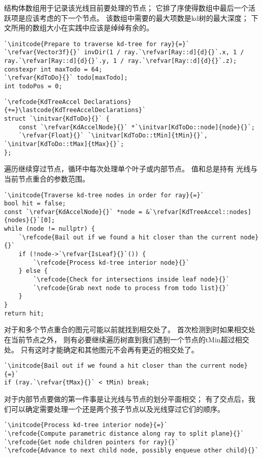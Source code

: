 结构体数组用于记录该光线目前要处理的节点；
它排了序使得数组中最后一个活跃项是应该考虑的下一个节点。
该数组中需要的最大项数是kd树的最大深度；
下文所用的数组大小在实践中应该是绰绰有余的。
\begin{lstlisting}
`\initcode{Prepare to traverse kd-tree for ray}{=}`
`\refvar{Vector3f}{}` invDir(1 / ray.`\refvar[Ray::d]{d}{}`.x, 1 / ray.`\refvar[Ray::d]{d}{}`.y, 1 / ray.`\refvar[Ray::d]{d}{}`.z);
constexpr int maxTodo = 64;
`\refvar{KdToDo}{}` todo[maxTodo];
int todoPos = 0;
\end{lstlisting}
\begin{lstlisting}
`\refcode{KdTreeAccel Declarations}{+=}\lastcode{KdTreeAccelDeclarations}`
struct `\initvar{KdToDo}{}` {
    const `\refvar{KdAccelNode}{}` *`\initvar[KdToDo::node]{node}{}`;
    `\refvar{Float}{}` `\initvar[KdToDo::tMin]{tMin}{}`, `\initvar[KdToDo::tMax]{tMax}{}`;
};
\end{lstlisting}

遍历继续穿过节点，循环中每次处理单个叶子或内部节点。
值和总是持有
光线与当前节点重合的参数范围。
\begin{lstlisting}
`\initcode{Traverse kd-tree nodes in order for ray}{=}`
bool hit = false;
const `\refvar{KdAccelNode}{}` *node = &`\refvar[KdTreeAccel::nodes]{nodes}{}`[0];
while (node != nullptr) {
    `\refcode{Bail out if we found a hit closer than the current node}{}`
    if (!node->`\refvar{IsLeaf}{}`()) {
        `\refcode{Process kd-tree interior node}{}`
    } else {
        `\refcode{Check for intersections inside leaf node}{}`
        `\refcode{Grab next node to process from todo list}{}`
    }
}
return hit;
\end{lstlisting}

对于和多个节点重合的图元可能以前就找到相交处了。
首次检测到时如果相交处在当前节点之外，
则有必要继续遍历树直到我们遇到一个节点的{\ttfamily tMin}超过相交处。
只有这时才能确定和其他图元不会再有更近的相交处了。
\begin{lstlisting}
`\initcode{Bail out if we found a hit closer than the current node}{=}`
if (ray.`\refvar{tMax}{}` < tMin) break;
\end{lstlisting}

对于内部节点要做的第一件事是让光线与节点的划分平面相交；
有了交点后，我们可以确定需要处理一个还是两个孩子节点以及光线穿过它们的顺序。
\begin{lstlisting}
`\initcode{Process kd-tree interior node}{=}`
`\refcode{Compute parametric distance along ray to split plane}{}`
`\refcode{Get node children pointers for ray}{}`
`\refcode{Advance to next child node, possibly enqueue other child}{}`
\end{lstlisting}

